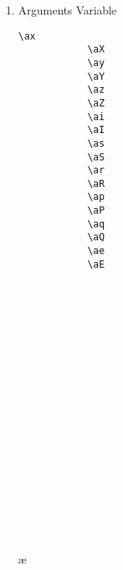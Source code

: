 \documentclass[10pt, a4paper]{article}
\begin{document}
\begin{enumerate}
\begin{center}
\begin{minipage}[h][8.6cm][t]{15em}
\begin{fgls}
					\jD\\
					\ji\\
					\jI\\
					\ci\\
					\cI\\
					\cd\\
					\cD\\
					\ce\\
					\cE
				\end{fgls}
			\end{minipage}
		\end{center}
		\item Arguments Variable
		\begin{center}
			\begin{minipage}[h][8cm][t]{15em}
				\begin{lstlisting}[style=B]
			\ax
			\aX
			\ay
			\aY
			\az
			\aZ
			\ai
			\aI
			\as
			\aS
			\ar
			\aR
			\ap
			\aP
			\aq
			\aQ
			\ae
			\aE
				\end{lstlisting}
			\end{minipage}
			\begin{minipage}[h][8cm][t]{15em}
				\begin{fgls}
					\ \\
					\ax\\
					\aX\\
					\ay\\
					\aY\\
					\az\\
					\aZ\\
					\ai\\
					\aI\\
					\as\\
					\aS\\
					\ar\\
					\aR\\
					\ap\\
					\aP\\
					\aq\\
					\aQ\\
					\ae\\
					\aE
				\end{fgls}
			\end{minipage}
		\end{center}
		

\end{enumerate}
\end{document}
